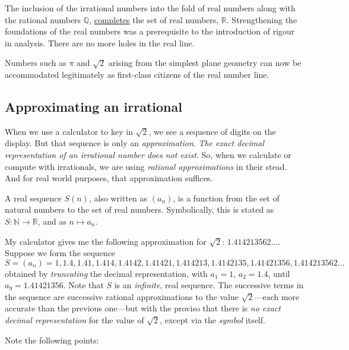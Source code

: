 \documentclass[
  a4paper,
]{article}
\begin{document}
The inclusion of the irrational numbers into the fold of real numbers
along with the rational numbers \(\mathbb{Q}\),
\href{https://en.wikipedia.org/wiki/Completeness_of_the_real_numbers}{completes}
the set of real numbers, \(\mathbb{R}\). Strengthening the foundations
of the real numbers was a prerequisite to the introduction of rigour in
analysis. There are no more holes in the real line.

Numbers such as \(\pi\) and \(\sqrt{2}\) arising from the simplest plane
geometry can now be accommodated legitimately as first-class citizens of
the real number line.

\subsection{Approximating an
irrational}\label{approximating-an-irrational}

When we use a calculator to key in \(\sqrt{2}\), we see a sequence of
digits on the display. But that sequence is only an
\emph{approximation}. \emph{The exact decimal representation of an
irrational number does not exist}. So, when we calculate or compute with
irrationals, we are using \emph{rational approximations} in their stead.
And for real world purposes, that approximation suffices.

A real sequence \(S(n)\), also written as \((a_{n})\), is a function
from the set of natural numbers to the set of real numbers.
Symbolically, this is stated as \(S: \mathbb{N} \to \mathbb{R}\), and as
\(n \mapsto a_{n}\).

My calculator gives me the following approximation for \(\sqrt{2}\):
\(1.414213562\dots\). Suppose we form the sequence \[
S = (a_n) = 1, 1.4, 1.41, 1.414, 1.4142, 1.41421, 1.414213, 1.4142135, 1.41421356, 1.414213562 \dots
\] obtained by \emph{truncating} the decimal representation, with
\(a_{1} = 1\), \(a_{2} = 1.4\), until \(a_{9} = 1.41421356\). Note that
\(S\) is an \emph{infinite}, real sequence. The successive terms in the
sequence are successive rational approximations to the value
\(\sqrt{2}\)---each more accurate than the previous one---but with the
proviso that there is \emph{no exact decimal representation} for the
value of \(\sqrt{2}\), except via the \emph{symbol} itself.

Note the following points:
\end{document}
